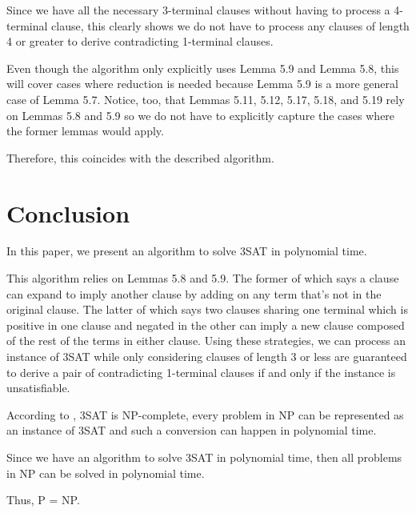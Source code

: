 \documentclass[manuscript]{acmart}
\begin{document}
    Since we have all the necessary 3-terminal clauses without having
    to process a 4-terminal clause, this clearly shows we do not
    have to process any clauses of length 4 or greater to derive contradicting 1-terminal
    clauses.
    
    Even though the algorithm only explicitly uses Lemma 5.9 and Lemma 5.8, this will
    cover cases where reduction is needed because Lemma 5.9 is a more
    general case of Lemma 5.7. Notice, too, that Lemmas 5.11, 5.12, 5.17,
    5.18, and 5.19 rely on Lemmas 5.8 and 5.9 so we do not have to 
    explicitly capture the cases where the former lemmas would apply.

    Therefore, this coincides with the described algorithm.

    \section{Conclusion} 

    In this paper, we present an algorithm to solve 3SAT in polynomial time.

    This algorithm relies on Lemmas 5.8 and 5.9. The former of which says a clause
    can expand to imply another clause by adding on any term that's not in the original clause.
    The latter of which says two clauses sharing one terminal which is positive in one
    clause and negated in the other can imply a new clause composed of the rest of the terms
    in either clause. Using these strategies, we can process an instance of 3SAT 
    while only considering clauses of length 3 or less
    are guaranteed to derive a pair of contradicting 1-terminal clauses if and only if
    the instance is unsatisfiable.

    According to 
    \cite{Karp1972}, 3SAT is NP-complete, every problem in NP can be represented
    as an instance of 3SAT and such a conversion can happen in polynomial time.
    
    Since we have an algorithm to solve 3SAT in polynomial time, then all problems
    in NP can be solved in polynomial time.

    Thus, P = NP. 

    
    
\end{document}
